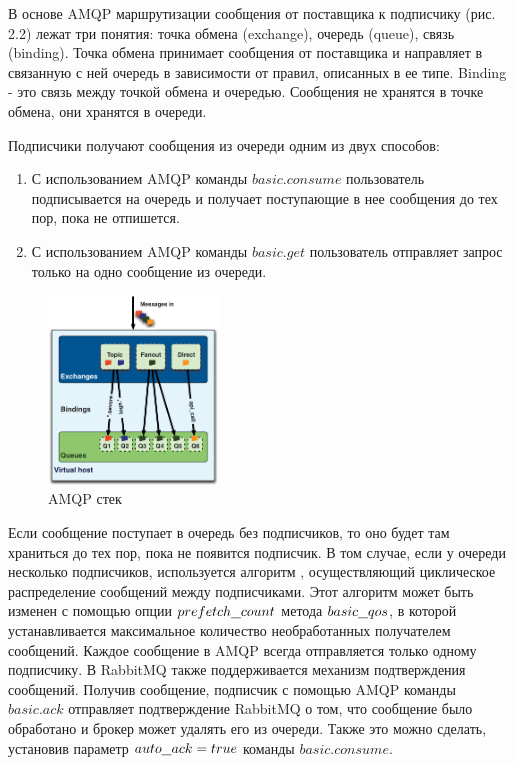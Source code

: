 В основе AMQP маршрутизации сообщения от поставщика к подписчику (рис. 2.2) лежат три понятия: точка обмена (exchange), очередь (queue), связь (binding). Точка обмена принимает сообщения от поставщика и направляет в связанную с ней очередь в зависимости от правил, описанных в ее типе. Binding - это связь между точкой обмена и очередью. Сообщения не хранятся в точке обмена, они хранятся в очереди.\par
Подписчики получают сообщения из очереди одним из двух способов:
\begin{enumerate}
  \item С использованием AMQP команды $basic.consume$ пользователь подписывается на очередь и получает поступающие в нее сообщения до тех пор, пока не отпишется. 
  \item С использованием AMQP команды $basic.get$ пользователь отправляет запрос только на одно сообщение из очереди. 
\end{enumerate}
\begin{figure}
\centering
\includegraphics[width=0.4\textwidth]{img/queues.png}
\caption{AMQP стек}
\end{figure}
Если сообщение поступает в очередь без подписчиков, то оно будет там храниться до тех пор, пока не появится подписчик. В том случае, если у очереди несколько подписчиков, используется алгоритм , осуществляющий циклическое распределение сообщений между подписчиками. Этот алгоритм может быть изменен с помощью опции $prefetch\underline{\hspace{0.25cm}}count$ метода $basic\underline{\hspace{0.25cm}}qos$, в которой устанавливается максимальное количество необработанных получателем сообщений. Каждое сообщение в AMQP всегда отправляется только одному подписчику. В RabbitMQ также поддерживается механизм подтверждения сообщений. Получив сообщение, подписчик с помощью AMQP команды  $basic.ack$ отправляет подтверждение RabbitMQ о том, что сообщение было обработано и брокер может удалять его из очереди. Также это можно сделать, установив параметр  $auto\underline{\hspace{0.25cm}}ack = true$ команды $basic.consume$.\par
